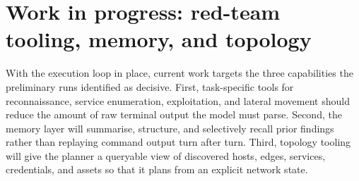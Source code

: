 \documentclass[12pt,oneside]{report}
\begin{document}
\begin{table}[!htbp]
    \centering
    \caption{Exploratory runtime and cost by environment. Each cell reports
        runtime / token cost where available. Incalmo runtimes are approximate
        visual readings where exact values are not printed.}
    \label{tab:agent-benchmark-results}
    \small
    \setlength{\tabcolsep}{4pt}
    \renewcommand{\arraystretch}{1.2}
\end{table}

\section[Work in progress]{Work in progress: red-team tooling, memory, and topology}
\label{sec:wip}
With the execution loop in place, current work targets the three capabilities
the preliminary runs identified as decisive. First, task-specific tools for
reconnaissance, service enumeration, exploitation, and lateral movement should
reduce the amount of raw terminal output the model must parse. Second, the memory
layer will summarise, structure, and selectively recall prior findings rather
than replaying command output turn after turn. Third, topology tooling will give
the planner a queryable view of discovered hosts, edges, services, credentials,
and assets so that it plans from an explicit network state.
\end{document}
